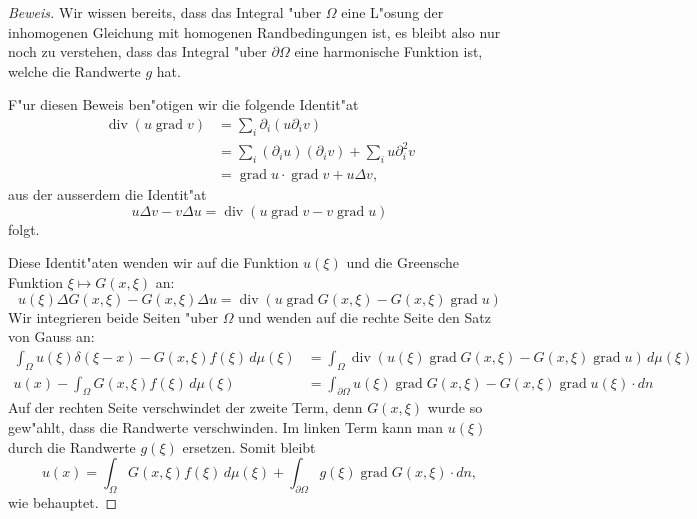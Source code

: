 \begin{proof}[Beweis]
Wir wissen bereits, dass das Integral "uber $\Omega$ eine L"osung der
inhomogenen Gleichung mit homogenen Randbedingungen ist, es
bleibt also nur noch zu verstehen, dass das Integral "uber $\partial \Omega$
eine harmonische Funktion ist, welche die Randwerte $g$ hat.

F"ur diesen Beweis ben"otigen wir die folgende Identit"at
\begin{align*}
\operatorname{div}(u\operatorname{grad}v)
&=
\sum_i\partial_i(u\partial_iv)
\\
&=\sum_i(\partial_iu)(\partial_iv)+\sum_iu\partial_i^2v
\\
&=\operatorname{grad}u\cdot\operatorname{grad}v+u\Delta v,
\end{align*}
aus der ausserdem die Identit"at
\[
u\Delta v-v\Delta u=\operatorname{div}(u\operatorname{grad}v-v\operatorname{grad}u)
\]
folgt.

Diese Identit"aten wenden wir auf die Funktion $u(\xi)$
und die Greensche Funktion $\xi\mapsto G(x,\xi)$ an:
\[
u(\xi)\Delta G(x,\xi)-G(x,\xi)\Delta u
=
\operatorname{div}(u\operatorname{grad}G(x,\xi)-G(x,\xi)\operatorname{grad}u)
\]
Wir integrieren beide Seiten "uber $\Omega$ und wenden auf die rechte Seite
den Satz von Gauss an:
\begin{align*}
\int_{\Omega}u(\xi)\delta(\xi - x)-G(x,\xi)f(\xi)\,d\mu(\xi)
&=
\int_{\Omega}\operatorname{div}(u(\xi)\operatorname{grad}G(x,\xi)-G(x,\xi)\operatorname{grad}u)\,d\mu(\xi)
\\
u(x)-\int_{\Omega}G(x,\xi)f(\xi)\,d\mu(\xi)
&=\int_{\partial \Omega}u(\xi)\operatorname{grad}G(x,\xi)-G(x,\xi)\operatorname{grad}u(\xi)\cdot dn
\end{align*}
Auf der rechten Seite verschwindet der zweite Term, denn $G(x,\xi)$ wurde
so gew"ahlt, dass die Randwerte verschwinden.
Im linken Term kann man $u(\xi)$ durch die Randwerte $g(\xi)$ ersetzen.
Somit bleibt
\[
u(x)=\int_{\Omega}G(x,\xi)f(\xi)\,d\mu(\xi)+\int_{\partial\Omega}g(\xi)\operatorname{grad}G(x,\xi)\cdot dn,
\]
wie behauptet.
\end{proof}

